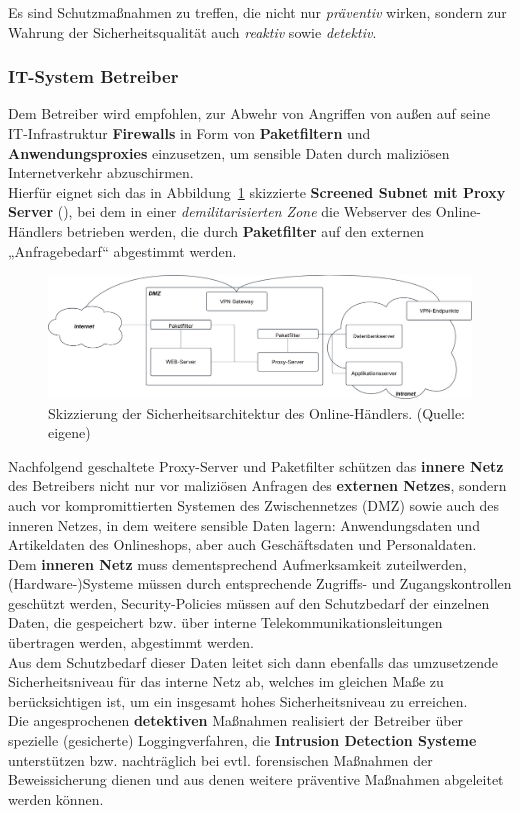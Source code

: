 Es sind Schutzmaßnahmen zu treffen, die nicht nur \textit{präventiv} wirken, sondern zur Wahrung der Sicherheitsqualität auch \textit{reaktiv} sowie \textit{detektiv}.

\subsubsection*{IT-System Betreiber}

Dem Betreiber wird empfohlen, zur Abwehr von Angriffen von außen auf seine IT-Infrastruktur \textbf{Firewalls} in Form von \textbf{Paketfiltern} und \textbf{Anwendungsproxies} einzusetzen, um sensible Daten durch maliziösen Internetverkehr abzuschirmen.\\
Hierfür eignet sich das in Abbildung~\ref{fig:screened_subnet} skizzierte \textbf{Screened Subnet mit Proxy Server} (\cite[89 f.]{ITS4}), bei dem in einer \textit{demilitarisierten Zone} die Webserver des Online-Händlers betrieben werden, die durch \textbf{Paketfilter} auf den externen „Anfragebedarf“ abgestimmt werden.\\

\begin{figure}
    \centering
    \includegraphics[scale=0.25]{aufgabe 2/img/screened_subnet.svg}
    \caption{Skizzierung der Sicherheitsarchitektur des Online-Händlers. (Quelle: eigene)}
    \label{fig:screened_subnet}
\end{figure}

\noindent
Nachfolgend geschaltete Proxy-Server und Paketfilter schützen das \textbf{innere Netz} des Betreibers nicht nur vor maliziösen Anfragen des \textbf{externen Netzes}, sondern auch vor kompromittierten Systemen des Zwischennetzes (DMZ) sowie auch des inneren Netzes, in dem weitere sensible Daten lagern: Anwendungsdaten und Artikeldaten des Onlineshops, aber auch Geschäftsdaten und Personaldaten.\\
Dem \textbf{inneren Netz} muss dementsprechend Aufmerksamkeit zuteilwerden, (Hardware-)Systeme müssen durch entsprechende Zugriffs- und Zugangskontrollen geschützt werden, Security-Policies müssen auf den Schutzbedarf der einzelnen Daten, die gespeichert bzw. über interne Telekommunikationsleitungen übertragen werden, abgestimmt werden.\\
Aus dem Schutzbedarf dieser Daten leitet sich dann ebenfalls das umzusetzende Sicherheitsniveau für das interne Netz ab, welches im gleichen Maße zu berücksichtigen ist, um ein insgesamt hohes Sicherheitsniveau zu erreichen.\\
Die angesprochenen \textbf{detektiven} Maßnahmen realisiert der Betreiber über spezielle (gesicherte) Loggingverfahren, die \textbf{Intrusion Detection Systeme} unterstützen bzw. nachträglich bei evtl. forensischen Maßnahmen der Beweissicherung dienen und aus denen weitere präventive Maßnahmen abgeleitet werden können.


